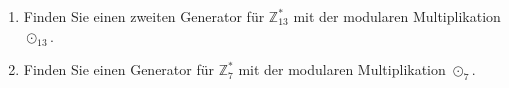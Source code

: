 \begin{enumerate}
	\item Finden Sie einen zweiten Generator für $\mathbb{Z}_{13}^*$ mit der modularen Multiplikation $\odot_{13}$.
	
	\fillwithgrid{3in}
	
	\item Finden Sie einen Generator für $\mathbb{Z}_{7}^*$ mit der modularen Multiplikation $\odot_{7}$.


%
%

\end{enumerate}
